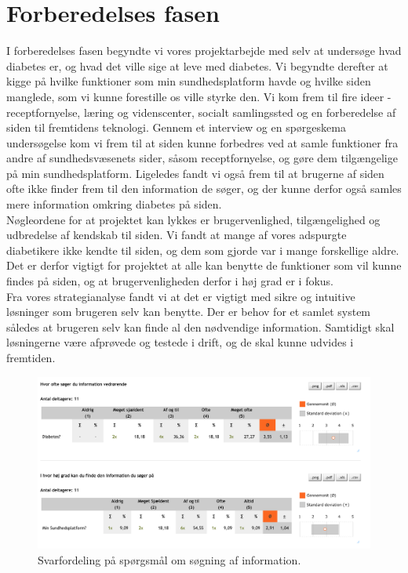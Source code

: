 \section{Forberedelses fasen}
I forberedelses fasen begyndte vi vores projektarbejde med selv at undersøge hvad diabetes er, og hvad det ville sige at leve med diabetes. Vi begyndte derefter at kigge på hvilke funktioner som min sundhedsplatform havde og hvilke siden manglede, som vi kunne forestille os ville styrke den. Vi kom frem til fire ideer - receptfornyelse, læring og videnscenter, socialt samlingssted og en forberedelse af siden til fremtidens teknologi. Gennem et interview og en spørgeskema undersøgelse kom vi frem til at siden kunne forbedres ved at samle funktioner fra andre af sundhedsvæsenets sider, såsom receptfornyelse, og gøre dem tilgængelige på min sundhedsplatform. Ligeledes fandt vi også frem til at brugerne af siden ofte ikke finder frem til den information de søger, og der kunne derfor også samles mere information omkring diabetes på siden.\\
Nøgleordene for at projektet kan lykkes er brugervenlighed, tilgængelighed og udbredelse af kendskab til siden. Vi fandt at mange af vores adspurgte diabetikere ikke kendte til siden, og dem som gjorde var i mange forskellige aldre. Det er derfor vigtigt for projektet at alle kan benytte de funktioner som vil kunne findes på siden, og at brugervenligheden derfor i høj grad er i fokus.\\
Fra vores strategianalyse fandt vi at det er vigtigt med sikre og intuitive løsninger som brugeren selv kan benytte. Der er behov for et samlet system således at brugeren selv kan finde al den nødvendige information. Samtidigt skal løsningerne være afprøvede og testede i drift, og de skal kunne udvides i fremtiden.
\begin{figure}[H]
	\centering
	\includegraphics[width=\textwidth]{Materials/SeekingInformation}
	\caption{Svarfordeling på spørgsmål om søgning af information.}
\end{figure}
